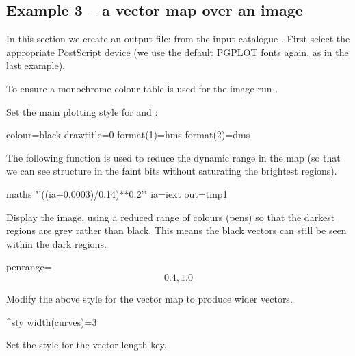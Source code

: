 \subsection{ Example 3 -- a vector map over an image}
\label{section:kappa-example3}


In this section we create an output file:  from the input
catalogue . First select the appropriate PostScript
device (we use the default PGPLOT fonts again, as in the last example).

\begin{terminalv}
\end{terminalv}


To ensure a monochrome colour table is used for the image run
.

\begin{terminalv}
\end{terminalv}


Set the main plotting style for  and
:

\begin{terminalv}
colour=black
drawtitle=0
format(1)=hms
format(2)=dms
\end{terminalv}


The following function is used to reduce the dynamic range in the map (so
that we can see structure in the faint bits without saturating the
brightest regions).

\begin{terminalv}
maths "'((ia+0.0003)/0.14)**0.2'" ia=iext out=tmp1
\end{terminalv}


Display the image, using a reduced range of colours (pens) so
that the darkest regions are grey rather than black.  This means the
black vectors can still be seen within the dark regions.

\begin{terminalv}
        penrange=\[0.4,1.0\]
\end{terminalv}


Modify the above style for the vector map to produce wider vectors.

\begin{terminalv}
^sty
width(curves)=3
\end{terminalv}


Set the style for the vector length key.

